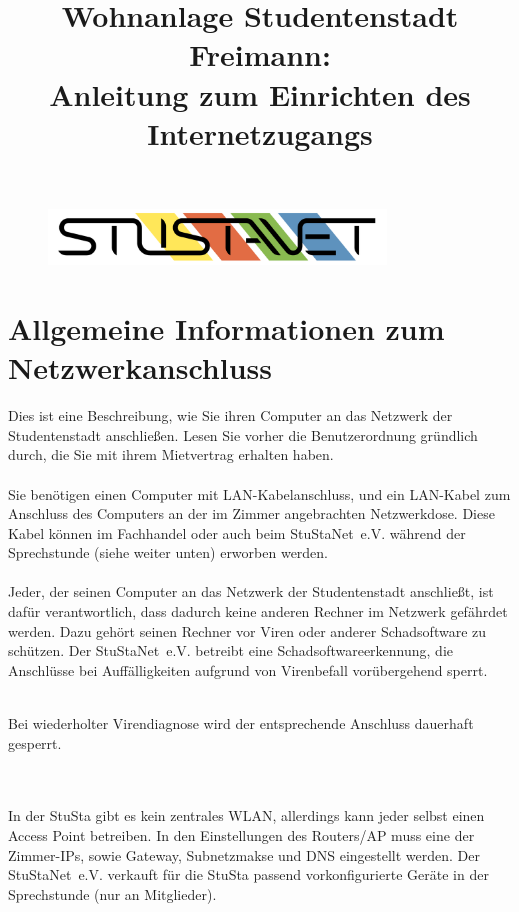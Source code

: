 \documentclass[a4paper,12pt]{scrartcl}
\title{Wohnanlage Studentenstadt Freimann:\\
       Anleitung zum Einrichten des Internetzugangs}
\begin{document}
\maketitle

\begin{figure}[t!]
   \centering
   \vspace{-20pt}
   \includegraphics[width=0.8\textwidth,keepaspectratio]{Bilder/StuStaNet_Logo}
   \vspace{-40pt}
\end{figure}

\section*{Allgemeine Informationen zum Netzwerkanschluss}

Dies ist eine Beschreibung, wie Sie ihren Computer an das Netzwerk der Studentenstadt anschließen. Lesen Sie vorher die Benutzerordnung gründlich durch, die Sie mit ihrem Mietvertrag erhalten haben.
\\
\\
Sie benötigen einen Computer mit LAN-Kabelanschluss, und ein LAN-Kabel zum Anschluss des Computers an der im Zimmer angebrachten Netzwerkdose. Diese Kabel können im Fachhandel oder auch beim StuStaNet~e.V. während der Sprechstunde (siehe weiter unten) erworben werden.
\\
\\
Jeder, der seinen Computer an das Netzwerk der Studentenstadt anschließt, ist dafür verantwortlich, dass dadurch keine anderen Rechner im Netzwerk gefährdet werden. Dazu gehört seinen Rechner vor Viren oder anderer Schadsoftware zu schützen.
Der StuStaNet~e.V. betreibt eine Schadsoftwareerkennung, die Anschlüsse bei Auffälligkeiten aufgrund von Virenbefall vorübergehend sperrt.
\\
\begin{bfseries}
	\\Bei wiederholter Virendiagnose wird der entsprechende Anschluss dauerhaft gesperrt.
\end{bfseries}
\\
\\
In der StuSta gibt es kein zentrales WLAN, allerdings kann jeder selbst einen Access Point betreiben. In den Einstellungen des Routers/AP muss eine der Zimmer-IPs, sowie Gateway, Subnetzmakse und DNS eingestellt werden. Der StuStaNet~e.V. verkauft für die StuSta passend vorkonfigurierte Geräte in der Sprechstunde (nur an Mitglieder).
\end{document}
